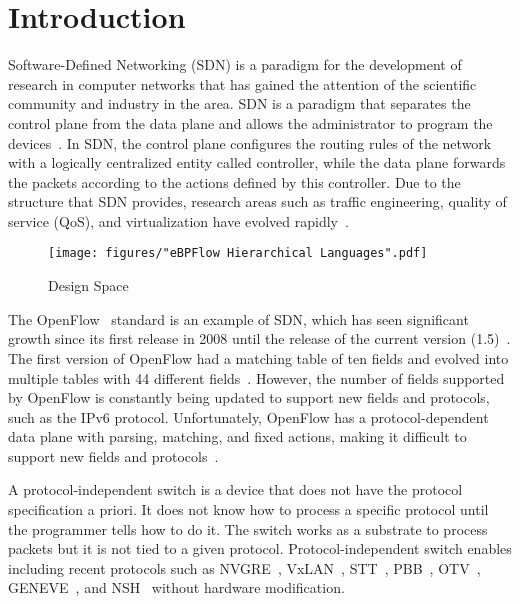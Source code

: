 \section{Introduction}
\label{sec:intro}

Software-Defined Networking (SDN) is a paradigm for the development of research in computer networks that has gained the attention of the scientific community and industry in the area. SDN is a paradigm that separates the control plane from the data plane and allows the administrator to program the devices~\cite{ProgrammableNetworks2015}. In SDN, the control plane configures the routing rules of the network with a logically centralized entity called controller, while the data plane forwards the packets according to the actions defined by this controller. Due to the structure that SDN provides, research areas such as traffic engineering, quality of service (QoS), and virtualization have evolved rapidly~\cite{stubbe2017p4}.

 \begin{figure}[!htp]
 \centering
\texttt{[image: figures/"eBPFlow Hierarchical Languages".pdf]}
 \caption{Design Space}
 \label{fig:Language}
 \end{figure}
 
The OpenFlow~\cite{McKeown:2008:OpenFlow} standard is an example of SDN, which has seen significant growth since its first release in 2008 until the release of the current version (1.5)~\cite{ChristianSurveySDN2015}. The first version of OpenFlow had a matching table of ten fields and evolved into multiple tables with 44 different fields~\cite{ChristianSurveySDN2015}. However, the number of fields supported by OpenFlow is constantly being updated to support new fields and protocols, such as the IPv6 protocol. Unfortunately, OpenFlow has a protocol-dependent data plane with parsing, matching, and fixed actions, making it difficult to support new fields and protocols~\cite{Jouet:2017:BPFabric}.

A protocol-independent switch is a device that does not have the protocol specification a priori. It does not know how to process a specific protocol until the programmer tells how to do it. The switch works as a substrate to process packets but it is not tied to a given protocol. Protocol-independent switch enables including recent protocols such as NVGRE~\cite{rfc7637}, VxLAN~\cite{mahalingam2013}, STT~\cite{davie2014stt}, PBB~\cite{kishjac-bmwg-evpntest-08}, OTV~\cite{hasmit-otv-04}, GENEVE~\cite{ietf-nvo3-geneve-05}, and NSH~\cite{rfc8300} without hardware modification.

